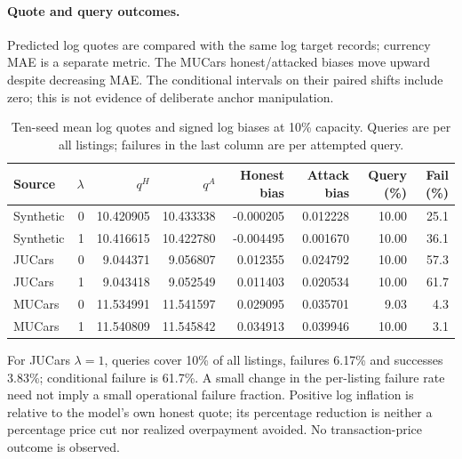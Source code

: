 \documentclass[11pt]{article}
\begin{document}
\paragraph{Quote and query outcomes.}
Predicted log quotes are compared with the same log target records; currency
MAE is a separate metric. The MUCars honest/attacked biases move upward despite
decreasing MAE. The conditional intervals on their paired shifts include zero;
this is not evidence of deliberate anchor manipulation.
\begin{table}[htbp]\centering\small
\caption{Ten-seed mean log quotes and signed log biases at 10\% capacity. Queries are per all listings; failures in the last column are per attempted query.}
\begin{tabular}{lrrrrrrr}\toprule
Source & $\lambda$ & $q^H$ & $q^A$ & Honest bias & Attack bias & Query (\%) & Fail (\%)\\\midrule
Synthetic & 0 & 10.420905 & 10.433338 & -0.000205 & 0.012228 & 10.00 & 25.1\\
Synthetic & 1 & 10.416615 & 10.422780 & -0.004495 & 0.001670 & 10.00 & 36.1\\
JUCars & 0 & 9.044371 & 9.056807 & 0.012355 & 0.024792 & 10.00 & 57.3\\
JUCars & 1 & 9.043418 & 9.052549 & 0.011403 & 0.020534 & 10.00 & 61.7\\
MUCars & 0 & 11.534991 & 11.541597 & 0.029095 & 0.035701 & 9.03 & 4.3\\
MUCars & 1 & 11.540809 & 11.545842 & 0.034913 & 0.039946 & 10.00 & 3.1\\
\bottomrule\end{tabular}\end{table}
For JUCars $\lambda=1$, queries cover 10\% of all listings, failures 6.17\%
and successes 3.83\%; conditional failure is 61.7\%. A small change in the
per-listing failure rate need not imply a small operational failure fraction.
Positive log inflation is relative to the model's own honest quote; its
percentage reduction is neither a percentage price cut nor realized
overpayment avoided. No transaction-price outcome is observed.
\end{document}

